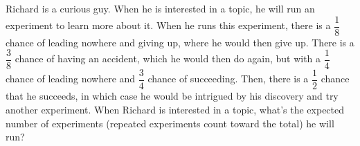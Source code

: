 Richard is a curious guy. When he is interested in a topic, he will run an experiment to learn more about it. When he runs this experiment, there is a $\dfrac{1}{8}$ chance of leading nowhere and giving up, where he would then give up. There is a $\dfrac{3}{8}$ chance of having an accident, which he would then do again, but with a $\dfrac{1}{4}$ chance of leading nowhere and $\dfrac{3}{4}$ chance of succeeding. Then, there is a $\dfrac{1}{2}$ chance that he succeeds, in which case he would be intrigued by his discovery and try another experiment. When Richard is interested in a topic, what's the expected number of experiments (repeated experiments count toward the total) he will run?
